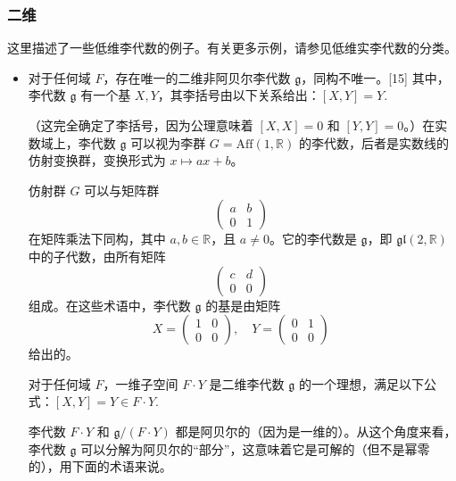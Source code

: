 \subsubsection{二维}  
这里描述了一些低维李代数的例子。有关更多示例，请参见低维实李代数的分类。

\begin{itemize}
\item 对于任何域 \( F \)，存在唯一的二维非阿贝尔李代数 \( \mathfrak{g} \)，同构不唯一。[15] 其中，李代数 \( \mathfrak{g} \) 有一个基 \( X, Y \)，其李括号由以下关系给出：\([X, Y] = Y\).

（这完全确定了李括号，因为公理意味着 \( [X, X] = 0 \) 和 \( [Y, Y] = 0 \)。）在实数域上，李代数 \( \mathfrak{g} \) 可以视为李群 \( G = \mathrm{Aff}(1, \mathbb{R}) \) 的李代数，后者是实数线的仿射变换群，变换形式为 \( x \mapsto ax + b \)。

仿射群 \( G \) 可以与矩阵群
\[
\left( \begin{array}{cc} a & b \\ 0 & 1 \end{array} \right)~
\]
在矩阵乘法下同构，其中 \( a, b \in \mathbb{R} \)，且 \( a \neq 0 \)。它的李代数是 \( \mathfrak{g} \)，即 \( \mathfrak{gl}(2, \mathbb{R}) \) 中的子代数，由所有矩阵
\[
\left( \begin{array}{cc} c & d \\ 0 & 0 \end{array} \right)~
\]
组成。在这些术语中，李代数 \( \mathfrak{g} \) 的基是由矩阵
\[
X = \left( \begin{array}{cc} 1 & 0 \\ 0 & 0 \end{array} \right), \quad Y = \left( \begin{array}{cc} 0 & 1 \\ 0 & 0 \end{array} \right)~
\]
给出的。

对于任何域 \( F \)，一维子空间 \( F \cdot Y \) 是二维李代数 \( \mathfrak{g} \) 的一个理想，满足以下公式：\([X, Y] = Y \in F \cdot Y\).

李代数 \( F \cdot Y \) 和 \( \mathfrak{g} / (F \cdot Y) \) 都是阿贝尔的（因为是一维的）。从这个角度来看，李代数 \( \mathfrak{g} \) 可以分解为阿贝尔的“部分”，这意味着它是可解的（但不是幂零的），用下面的术语来说。
\end{itemize}

